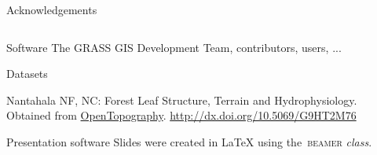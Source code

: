 \documentclass[xcolor={dvipsnames,usenames},beamer,aspectratio=169]{beamer}
\begin{document}
\begin{frame}{Acknowledgements}

\footnotesize

\begin{columns}
\begin{column}{0.6\textwidth}

\begin{block}{Software}
The GRASS GIS Development Team, contributors, users, ...
\end{block}

\begin{block}{Datasets}


Nantahala NF, NC: Forest Leaf Structure, Terrain and Hydrophysiology.
Obtained from \href{http://www.opentopography.org/}{OpenTopography}.
\url{http://dx.doi.org/10.5069/G9HT2M76}
\end{block}

\begin{block}{Presentation software}
Slides were created in \textrm{\LaTeX{}} using the~\textrm{\textsc{beamer} \textit{class}}.
\end{block}


\end{column}
\begin{column}{0.3\textwidth}


\end{column}
\end{columns}
\end{frame}
\end{document}

